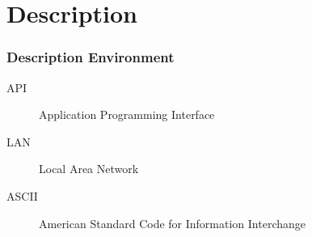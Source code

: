\section{Description}
\label{description}
\begin{frame}\frametitle{Description Environment}
  \begin{description}
    \item[API] Application Programming Interface
    \item[LAN] Local Area Network
    \item[ASCII] American Standard Code for Information Interchange
  \end{description}
\end{frame}